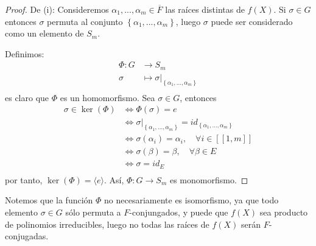 \documentclass[12pt]{report}
\theoremstyle{largebreak}
\newcommand\cf[3]{\ensuremath{#1:#2\rightarrow#3}}
\newcommand\natint[1]{\ensuremath{\left[\!\left[ #1\right]\!\right]}}
\begin{document}
    \begin{proof}
        De (i): Consideremos $\alpha_1,...,\alpha_m\in\overline{F}$ las raíces distintas de $f(X)$. Si $\sigma\in G$ entonces $\sigma$ permuta al conjunto $\left\{\alpha_1,...,\alpha_m\right\}$, luego $\sigma$ puede ser considerado como un elemento de $S_m$.

        Definimos:
        \begin{equation*}
            \begin{split}
                \Phi:G&\rightarrow S_m\\
                \sigma&\mapsto \sigma\big|_{\left\{\alpha_1,...,\alpha_m\right\}}\\
            \end{split}
        \end{equation*}
        es claro que $\Phi$ es un homomorfismo. Sea $\sigma\in G$, entonces
        \begin{equation*}
            \begin{split}
                \sigma\in\ker(\Phi)&\iff\Phi(\sigma)=e \\
                &\iff\sigma\big|_{\left\{\alpha_1,...,\alpha_m\right\}}=id_{\left\{\alpha_1,...,\alpha_m\right\} } \\
                &\iff \sigma(\alpha_i)=\alpha_i,\quad\forall i\in\natint{1,m}\\
                &\iff \sigma(\beta)=\beta,\quad\forall \beta\in E\\
                &\iff \sigma=id_E\\
            \end{split}
        \end{equation*}
        por tanto, $\ker(\Phi)=\langle e\rangle$. Así, $\cf{\Phi}{G}{S_m}$ es monomorfismo.
    \end{proof}

    \begin{obs}
        Notemos que la función $\Phi$ no necesariamente es isomorfismo, ya que todo elemento $\sigma\in G$ sólo permuta a $F$-conjungados, y puede que $f(X)$ sea producto de polinomios irreducibles, luego no todas las raíces de $f(X)$ serán $F$-conjugadas.
    \end{obs}
\end{document}
